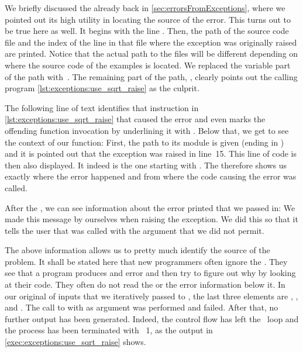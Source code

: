 We briefly discussed the  already back in \cref{sec:errorsFromExceptions}, where we pointed out its high utility in locating the source of the error.
This turns out to be true here as well.
It begins with the line .
Then, the path of the source code file  and the index of the line in that file where the exception was originally raised are printed.
Notice that the actual path to the files will be different depending on where the source code of the examples is located.
We replaced the variable part of the path with~\inQuotes{\{\dots\}}.
The remaining part of the path, , clearly points out the calling program \cref{lst:exceptions:use_sqrt_raise} as the culprit.

The following line of text identifies that instruction in \cref{lst:exceptions:use_sqrt_raise} that caused the error and even marks the offending function invocation by underlining it with \textil{{^}{^}{^}{^}{^}{^}{^}{^}{^}{^}{^}{^}}.
Below that, we get to see the context of our  function:
First, the path to its module is given (ending in ) and it is pointed out that the exception was raised in line~15.
This line of code is then also displayed.
It indeed is the one starting with .
The  therefore shows us exactly where the error happened and from where the code causing the error was called.%
%
\begin{sloppypar}%
After the , we can see information about the error printed that we passed in:
We made this message by ourselves when raising the exception.
We did this so that it tells the user that  was called with the argument  that we did not permit.%
\end{sloppypar}%
%
The above information allows us to pretty much identify the source of the problem.
It shall be stated here that new programmers often ignore the .
They see that a program produces and error and then try to figure out why by looking at their code.
They often do not read the  or the error information below it.%
%
%
%
In our original  of inputs that we iteratively passed to , the last three elements are , , and .
The call to  with  as argument was performed and failed.
After that, no further output has been generated.
Indeed, the control flow has left the ~loop and the process has been terminated with ~1, as the output in \cref{exec:exceptions:use_sqrt_raise} shows.

